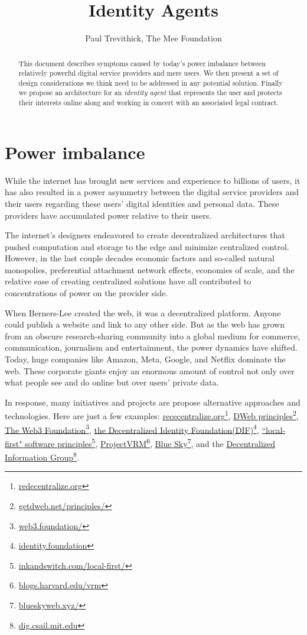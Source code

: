 \documentclass[11pt, oneside]{article}   	%
\title{Identity Agents}
\author{Paul Trevithick, The Mee Foundation}
\newcommand{\hyperfootnote}[1][]{\def\ArgI{{#1}}\hyperfootnoteRelay}
\newcommand\hyperfootnoteRelay[2][]{\href{#1#2}{\ArgI}\footnote{\href{#1#2}{#2}}}
\begin{document}
\maketitle
\begin{abstract}
This document describes symptoms caused by today's power imbalance between relatively powerful digital service providers and mere users. We then present a set of design considerations we think need to be addressed in any potential solution. Finally we propose an architecture for an \emph{identity agent} that represents the user and protects their interests online along and working in concert with an associated legal contract.
\end{abstract}

\section{Power imbalance}
While the internet has brought new services and experience to billions of users, it has also resulted in a power asymmetry between the digital service providers and their users regarding these users' digital identities and personal data. These providers have accumulated power relative to their users.

The internet's designers endeavored to create decentralized architectures that pushed computation and storage to the edge and minimize centralized control. However, in the last couple decades economic factors and so-called natural monopolies, preferential attachment network effects, economies of scale, and the relative ease of creating centralized solutions have all contributed to concentrations of power on the provider side. 

When Berners-Lee created the web, it was a decentralized platform. Anyone could publish a website and link to any other side. But as the web has grown from an obscure research-sharing community into a global medium for commerce, communication, journalism and entertainment, the power dynamics have shifted. Today, huge companies like Amazon, Meta, Google, and Netflix dominate the web. These corporate giants enjoy an enormous amount of control not only over what people see and do online but over users' private data.\cite{Finley2017}

In response, many initiatives and projects are propose alternative approaches and technologies. Here are just a few examples: \hyperfootnote[rececentralize.org][https://]{redecentralize.org}, \hyperfootnote[DWeb principles][https://]{getdweb.net/principles/}, \hyperfootnote[The Web3 Foundation][https://]{web3.foundation/}, \hyperfootnote[the Decentralized Identity Foundation(DIF)][https://]{identity.foundation}, \hyperfootnote[``local-first" software principles][https://]{inkandswitch.com/local-first/}, \hyperfootnote[ProjectVRM][https://]{blogs.harvard.edu/vrm}, \hyperfootnote[Blue Sky][https://]{blueskyweb.xyz/}, and the \hyperfootnote[Decentralized Information Group][https://]{dig.csail.mit.edu}. 
\end{document}
